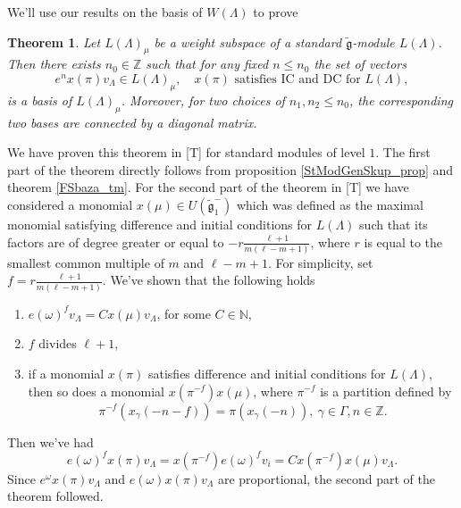 \documentclass[a4paper, 10pt,oneside]{amsart}
\newtheorem{tm}{Theorem}
\begin{document}
We'll use our results on the basis of $W(\Lambda)$ to prove
\begin{tm}
\label{StModBase_tm}
Let $L(\Lambda)_\mu$ be a weight subspace of a standard
${\tilde{{\mathfrak g}}}$-module $L(\Lambda)$. Then there exists $n_0\in{{\mathbb Z}}$ such that
for any fixed $n\leq n_0$ the set of vectors
$$e^n x(\pi)v_\Lambda\in L(\Lambda)_\mu, \quad x(\pi)\textrm{ satisfies IC and DC for } L(\Lambda),$$
is a basis of $L(\Lambda)_\mu$.
Moreover, for two choices of
$n_1,n_2\leq n_0$, the corresponding two bases are connected by a
diagonal matrix.
\end{tm}

We have proven this theorem in [T] for standard modules of level $1$.
The first part of the theorem directly follows from proposition \ref{StModGenSkup_prop} and theorem \ref{FSbaza_tm}.
For the second part of the theorem in [T] we have considered a monomial $x(\mu)\in U({\tilde{{\mathfrak g}}}_1^-)$ which was defined as
the maximal monomial satisfying difference and initial conditions for $L(\Lambda)$ such that its
factors are of degree greater or equal to $-r\frac{\ell+1}{m(\ell-m+1)}$, where $r$ is equal to the smallest common
multiple of $m$ and $\ell-m+1$. For simplicity, set $f=r\frac{\ell+1}{m(\ell-m+1)}$.
We've shown that the following holds
\begin{enumerate}

\item $e(\omega)^f v_\Lambda=C x(\mu)v_\Lambda$, for some $C\in
{{\mathbb N}}$,
\item $f$ divides $\ell +1$,
\item if a monomial $x(\pi)$ satisfies difference  and initial conditions for $L(\Lambda)$, then so does
a monomial $x(\pi^{-f})x(\mu)$, where $\pi^{-f}$ is a partition
defined by $$\pi^{-f}(x_\gamma(-n-f))=\pi(x_\gamma(-n)),
\ \gamma\in\Gamma, n\in{{\mathbb Z}}.$$
\end{enumerate}
Then we've had $$e(\omega)^f x(\pi)v_\Lambda=x(\pi^{-f})e(\omega)^f
v_i=C x(\pi^{-f})x(\mu)v_\Lambda.$$ Since $e^{\omega} x(\pi)v_\Lambda$ and
$e(\omega) x(\pi)v_\Lambda$ are proportional, the second part of the
theorem followed.
\end{document}
